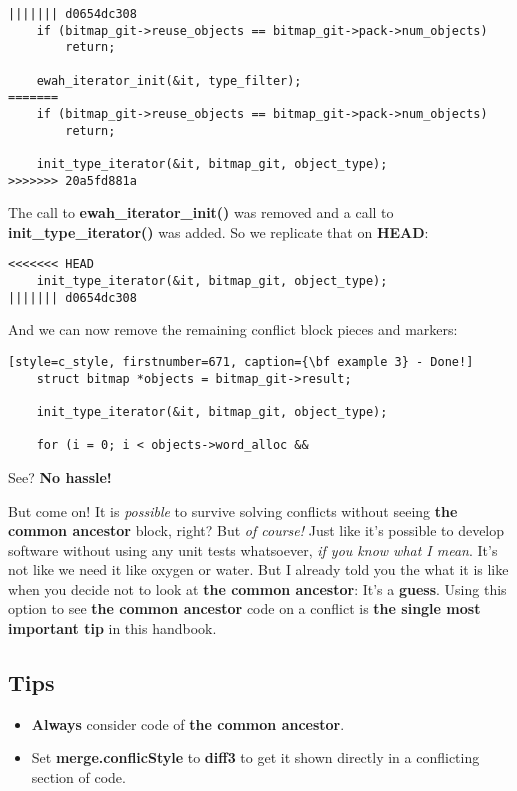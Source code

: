 \begin{lstlisting}[style=c_style, firstnumber=675, caption={\bf example 3} - step 2]
||||||| d0654dc308
	if (bitmap_git->reuse_objects == bitmap_git->pack->num_objects)
		return;

	ewah_iterator_init(&it, type_filter);
=======
	if (bitmap_git->reuse_objects == bitmap_git->pack->num_objects)
		return;

	init_type_iterator(&it, bitmap_git, object_type);
>>>>>>> 20a5fd881a
\end{lstlisting}

The call to {\bf ewah\_iterator\_init()} was removed and a call to {\bf init\_type\_iterator()} was
added. So we replicate that on {\bf HEAD}:

\begin{lstlisting}[style=c_style, firstnumber=673, caption={\bf example 3} - step 3]
<<<<<<< HEAD
	init_type_iterator(&it, bitmap_git, object_type);
||||||| d0654dc308
\end{lstlisting}

And we can now remove the remaining conflict block pieces and markers:

\begin{lstlisting}[style=c_style, firstnumber=671, caption={\bf example 3} - Done!]
	struct bitmap *objects = bitmap_git->result;

	init_type_iterator(&it, bitmap_git, object_type);

	for (i = 0; i < objects->word_alloc &&
\end{lstlisting}

See? {\bf No hassle!}

But come on! It is {\it possible} to survive solving conflicts without seeing {\bf the common ancestor} block, right?
But {\it of course!} Just like it's possible to develop software without using any unit tests whatsoever,
{\it if you know what I mean}. It's not like we need it like oxygen or water. But I already told you the what it is
like when you decide not to look at {\bf the common ancestor}: It's a {\bf guess}. Using this option to see
{\bf the common ancestor} code on a conflict is {\bf the single most important tip} in this handbook.

\subsection{Tips}
\begin{itemize}
	\item {\bf Always} consider code of {\bf the common ancestor}.
	\item Set {\bf merge.conflicStyle} to {\bf diff3} to get it shown directly in a conflicting section of code.
\end{itemize}


